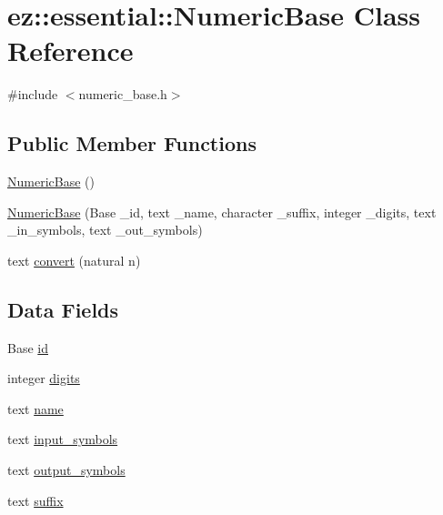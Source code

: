 \hypertarget{classez_1_1essential_1_1NumericBase}{}\section{ez\+:\+:essential\+:\+:Numeric\+Base Class Reference}
\label{classez_1_1essential_1_1NumericBase}


{\ttfamily \#include $<$numeric\+\_\+base.\+h$>$}

\subsection*{Public Member Functions}
\begin{DoxyCompactItemize}
\item 
\hyperlink{classez_1_1essential_1_1NumericBase_a816e881082f2b93889da1790974a486b}{Numeric\+Base} ()
\item 
\hyperlink{classez_1_1essential_1_1NumericBase_a156c1bbfb6ae7aa7e43c2bcd10e6bed4}{Numeric\+Base} (Base \+\_\+id, text \+\_\+name, character \+\_\+suffix, integer \+\_\+digits, text \+\_\+in\+\_\+symbols, text \+\_\+out\+\_\+symbols)
\item 
text \hyperlink{classez_1_1essential_1_1NumericBase_ae8c51c7134dbee02d7ed7ab1d23b1643}{convert} (natural n)
\end{DoxyCompactItemize}
\subsection*{Data Fields}
\begin{DoxyCompactItemize}
\item 
Base \hyperlink{classez_1_1essential_1_1NumericBase_aa809b2a41bf74d6c060d036567d9a309}{id}
\item 
integer \hyperlink{classez_1_1essential_1_1NumericBase_a17ca1826acad4a368ddbc17a77e1c337}{digits}
\item 
text \hyperlink{classez_1_1essential_1_1NumericBase_a12388b10bb1e05b0766191afc27e552e}{name}
\item 
text \hyperlink{classez_1_1essential_1_1NumericBase_a15523b84d459e3eec4ae4b00dc448eb3}{input\+\_\+symbols}
\item 
text \hyperlink{classez_1_1essential_1_1NumericBase_a42db2f729893765e4e9a5a1085085e5d}{output\+\_\+symbols}
\item 
text \hyperlink{classez_1_1essential_1_1NumericBase_a3a30796f5294fc6d0b4d2d248ea51cf3}{suffix}
\end{DoxyCompactItemize}


